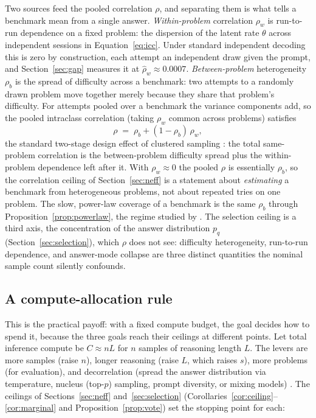 \documentclass[11pt]{article}
\begin{document}
Two sources feed the pooled correlation $\rho$, and separating them is what tells a benchmark mean from a single answer. \emph{Within-problem} correlation $\rho_w$ is run-to-run dependence on a fixed problem: the dispersion of the latent rate $\theta$ across independent sessions in Equation~\eqref{eq:icc}. Under standard independent decoding this is zero by construction, each attempt an independent draw given the prompt, and Section~\ref{sec:gap} measures it at $\hat\rho_w\approx0.0007$. \emph{Between-problem} heterogeneity $\rho_b$ is the spread of difficulty across a benchmark: two attempts to a randomly drawn problem move together merely because they share that problem's difficulty. For attempts pooled over a benchmark the variance components add, so the pooled intraclass correlation (taking $\rho_w$ common across problems) satisfies
\begin{equation}
\rho \;=\; \rho_b + (1-\rho_b)\,\rho_w ,
\label{eq:decomp}
\end{equation}
the standard two-stage design effect of clustered sampling \citep{cochran1977sampling}: the total same-problem correlation is the between-problem difficulty spread plus the within-problem dependence left after it. With $\rho_w\approx0$ the pooled $\rho$ is essentially $\rho_b$, so the correlation ceiling of Section~\ref{sec:neff} is a statement about \emph{estimating} a benchmark from heterogeneous problems, not about repeated tries on one problem. The slow, power-law coverage of a benchmark is the same $\rho_b$ through Proposition~\ref{prop:powerlaw}, the regime studied by \citet{schaeffer2025powerlaws}. The selection ceiling is a third axis, the concentration of the answer distribution $p_q$ (Section~\ref{sec:selection}), which $\rho$ does not see: difficulty heterogeneity, run-to-run dependence, and answer-mode collapse are three distinct quantities the nominal sample count silently confounds.

\subsection{A compute-allocation rule}
\label{sec:allocate}

This is the practical payoff: with a fixed compute budget, the goal decides how to spend it, because the three goals reach their ceilings at different points. Let total inference compute be $C \approx n L$ for $n$ samples of reasoning length $L$. The levers are more samples (raise $n$), longer reasoning (raise $L$, which raises $s$), more problems (for evaluation), and decorrelation (spread the answer distribution via temperature, nucleus (top-$p$) sampling, prompt diversity, or mixing models) \citep{holtzman2020curious,wang2025diversity,muennighoff2025s1}. The ceilings of Sections~\ref{sec:neff} and~\ref{sec:selection} (Corollaries~\ref{cor:ceiling}--\ref{cor:marginal} and Proposition~\ref{prop:vote}) set the stopping point for each:
\end{document}
